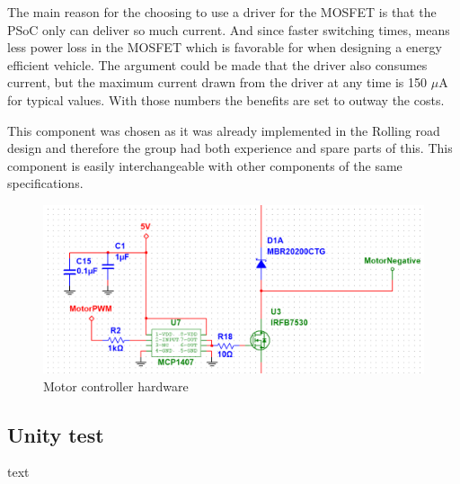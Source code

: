 The main reason for the choosing to use a driver for the MOSFET is that the PSoC only can deliver so much current. And since faster switching times, means less power loss in the MOSFET which is favorable for when designing a energy efficient vehicle. The argument could be made that the driver also consumes current, but the maximum current drawn from the driver at any time is 150 $\mu $A for typical values. With those numbers the benefits are set to outway the costs.  

This component was chosen as it was already implemented in the Rolling road design and therefore the group had both experience and spare parts of this. This component is easily interchangeable with other components of the same specifications. 

\begin{figure}[H]
	\centering
	\includegraphics[width=0.85\linewidth]{Hardware/Pictures/Motorstyring}
	\caption{Motor controller hardware}
	\label{fig:Motorcontroller}
\end{figure}


\subsection{Unity test}
text